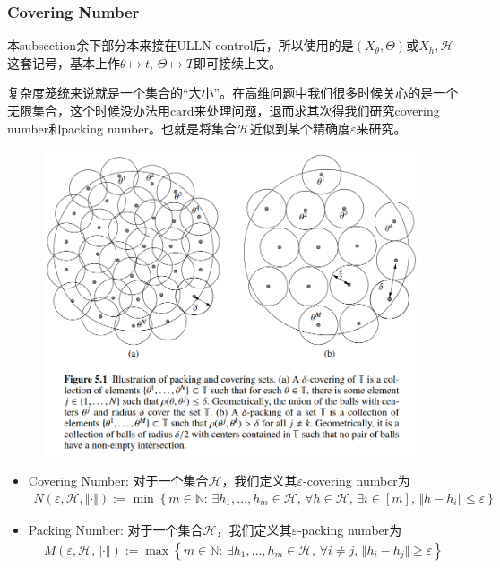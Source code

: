 \documentclass[11pt,a4paper]{ctexart}
\numberwithin{equation}{section}%
\begin{document}
\subsubsection{Covering Number}
{\color{blue}本subsection余下部分本来接在ULLN control后，所以使用的是$ (X_\theta ,\Theta ) $或$ X_h,\mathcal{H} $这套记号，基本上作$ \theta \mapsto t,\, \Theta \mapsto T $即可接续上文。}

复杂度笼统来说就是一个集合的“大小”。在高维问题中我们很多时候关心的是一个无限集合，这个时候没办法用$ \mathrm{card} $来处理问题，退而求其次得我们研究covering number和packing number。也就是将集合$ \mathcal{H} $近似到某个精确度$ \varepsilon  $来研究。

\begin{figure}[htbp]
    \centering
    \includegraphics[width = 0.9\linewidth]{images/2024-08-05-14-29-34.png}
\end{figure}

\begin{itemize}[topsep=2pt,itemsep=2pt]
    \item Covering Number: 对于一个集合$ \mathcal{H} $，我们定义其$ \varepsilon $-covering number为
    \begin{align*}
        N(\varepsilon, \mathcal{H}, \Vert \cdot \Vert ) := \min\left\{ m\in \mathbb{N}:\, \exists h_1,\ldots,h_m\in \mathcal{H},\, \forall h\in \mathcal{H},\, \exists i\in [m],\, \Vert h-h_i \Vert \leq \varepsilon \right\}
    \end{align*}
    \item Packing Number: 对于一个集合$ \mathcal{H} $，我们定义其$ \varepsilon $-packing number为
    \begin{align*}
        M(\varepsilon, \mathcal{H}, \Vert \cdot \Vert ) := \max\left\{ m\in \mathbb{N}:\, \exists h_1,\ldots,h_m\in \mathcal{H},\, \forall i\neq j,\, \Vert h_i-h_j \Vert \geq \varepsilon \right\}
    \end{align*}

\end{itemize}
\end{document}
